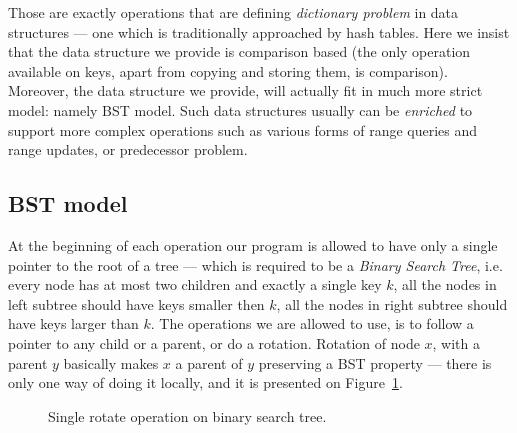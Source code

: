 \documentclass[11pt]{article}
\begin{document}
Those are exactly operations that are defining {\it dictionary problem} in data structures --- one which is traditionally approached by hash tables. Here we insist that the data structure we provide is comparison based (the only operation available on keys, apart from copying and storing them, is comparison). Moreover, the data structure we provide, will actually fit in much more strict model: namely BST model. Such data structures usually can be {\it enriched} to support more complex operations such as various forms of range queries and range updates, or predecessor problem. 
\subsection{BST model}
At the beginning of each operation our program is allowed to have only a single pointer to the root of a tree --- which is required to be a {\it Binary Search Tree}, i.e. every node has at most two children and exactly a single key $k$, all the nodes in left subtree should have keys smaller then $k$, all the nodes in right subtree should have keys larger than $k$. The operations we are allowed to use, is to follow a pointer to any child or a parent, or do a rotation. Rotation of node $x$, with a parent $y$ basically makes $x$ a parent of $y$ preserving a BST property --- there is only one way of doing it locally, and it is presented on Figure~\ref{rotate}.
\begin{figure}
\begin{center}
\end{center}
\caption{\label{rotate}Single rotate operation on binary search tree.}
\end{figure}
\end{document}
